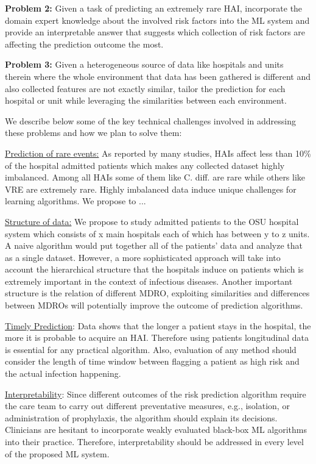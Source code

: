 {\noindent \bf Problem 2:} Given a task of predicting an extremely rare HAI, incorporate the domain expert knowledge about the involved risk factors into the ML system and provide an interpretable answer that suggests which collection of risk factors are affecting the prediction outcome the most. 

{\noindent \bf Problem 3:} Given a heterogeneous source of data like hospitals and units therein where the whole environment that data has been gathered is different and also collected features are not exactly similar, tailor the prediction for each hospital or unit while leveraging the similarities between each environment. 

We describe below some of the key technical challenges involved in addressing these problems and how we plan to solve them:

\underline{Prediction of rare events:} As reported by many studies, HAIs affect less than 10\% of the hospital admitted patients which makes any collected dataset highly imbalanced. Among all HAIs some of them like C. diff. are rare while others like VRE are extremely rare. Highly imbalanced data induce unique challenges for learning algorithms. We propose to ... 

\underline{Structure of data:} We propose to study admitted patients to the OSU hospital system which consists of x main hospitals each of which has between y to z units. A naive algorithm would put together all of the patients' data and analyze that as a single dataset. However, a more sophisticated approach will take into account the hierarchical structure that the hospitals induce on patients which is extremely important in the context of infectious diseases. Another important structure is the relation of different MDRO, exploiting similarities and differences between MDROs will potentially improve the outcome of prediction algorithms. 

\underline{Timely Prediction}: Data shows that the longer a patient stays in the hospital, the more it is probable to acquire an HAI. Therefore using patients longitudinal data is essential for any practical algorithm. Also, evaluation of any method should consider the length of time window between flagging a patient as high risk and the actual infection happening.  

\underline{Interpretability}: Since different outcomes of the risk prediction algorithm require the care team to carry out different preventative measures, e.g., isolation, or administration of prophylaxis, the algorithm should explain its decisions. Clinicians are hesitant to incorporate weakly evaluated black-box ML algorithms into their practice. Therefore, interpretability should be addressed in every level of the proposed ML system. 

